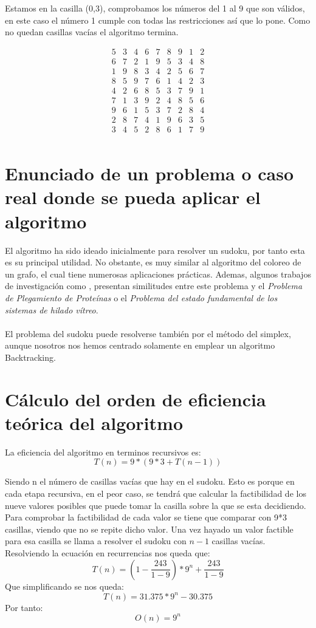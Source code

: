 \documentclass[11pt, a4paper]{article}
\theoremstyle{theorem-style}
\theoremstyle{definition-style}
\theoremstyle{remark-style}
\theoremstyle{example-style}
\begin{document}
Estamos en la casilla (0,3), comprobamos los números del 1 al 9 que son válidos, en este caso el número 1 cumple con todas las restricciones así que lo pone. Como no quedan casillas vacías el algoritmo termina.

\[
\begin{array}{ccccccccc}
5 & 3 & 4 & 6 & 7 & 8 & 9 & 1 & 2\\
6 & 7 & 2 & 1 & 9 & 5 & 3 & 4 & 8\\
1 & 9 & 8 & 3 & 4 & 2 & 5 & 6 & 7\\
8 & 5 & 9 & 7 & 6 & 1 & 4 & 2 & 3\\
4 & 2 & 6 & 8 & 5 & 3 & 7 & 9 & 1\\
7 & 1 & 3 & 9 & 2 & 4 & 8 & 5 & 6\\
9 & 6 & 1 & 5 & 3 & 7 & 2 & 8 & 4\\
2 & 8 & 7 & 4 & 1 & 9 & 6 & 3 & 5\\
3 & 4 & 5 & 2 & 8 & 6 & 1 & 7 & 9\\
\end{array}
\]


\section{Enunciado de un problema o caso real donde se pueda aplicar el algoritmo}

El algoritmo ha sido ideado inicialmente para resolver un sudoku, por tanto esta es su principal utilidad.  No obstante, es muy similar al algoritmo del coloreo de un grafo, el cual tiene numerosas aplicaciones prácticas. Ademas, algunos trabajos de investigación como \cite{sudoku}, presentan similitudes entre este problema y el \textit{Problema de Plegamiento de Proteínas} o el \textit{Problema del estado fundamental de los sistemas de hilado vítreo}.
\paragraph{}
El problema del sudoku puede resolverse también por el método del simplex, aunque nosotros nos hemos centrado solamente en emplear un algoritmo Backtracking.
\section{Cálculo del orden de eficiencia teórica del algoritmo }
La eficiencia del algoritmo en terminos recursivos es: $$ T(n) = 9*(9*3 + T(n-1))$$

Siendo n el número de casillas vacías que hay en el sudoku. Esto es porque en cada etapa recursiva, en el peor caso, se tendrá que calcular la factibilidad de los nueve valores posibles que puede tomar la casilla sobre la que se esta decidiendo. Para comprobar la factibilidad de cada valor se tiene que comparar con 9*3 casillas, viendo que no se repite dicho valor. Una vez hayado un valor factible para esa casilla se llama a resolver el sudoku con $n-1$ casillas vacías. Resolviendo la ecuación en recurrencias nos queda que: $$ T(n) = (1 - \frac{243}{1-9})*9^n + \frac{243}{1-9}$$ Que simplificando se nos queda: $$T(n) = 31.375*9^n - 30.375 $$
Por tanto:
\[
O(n)=9^{n}
\]
\end{document}
